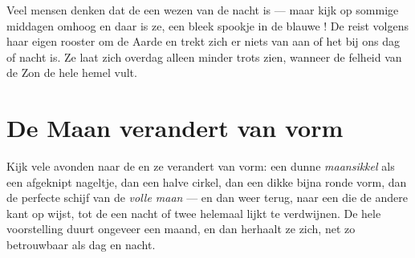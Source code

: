 \begin{remark}\label{rem:g2:moon-in-the-sky:daytime}
Veel mensen denken dat de  een wezen van de nacht is --- maar kijk
op sommige middagen omhoog en daar is ze, een bleek spookje in de
blauwe ! De  reist volgens haar eigen rooster om de Aarde en
trekt zich er niets van aan of het bij ons dag of nacht is. Ze laat
zich overdag alleen minder trots zien, wanneer de felheid van de Zon de
hele hemel vult.
\end{remark}

\section{De Maan verandert van vorm}

\begin{example}\label{ex:g2:moon-in-the-sky:shapes}
Kijk vele avonden naar de  en ze verandert van vorm: een dunne
\emph{maansikkel} als een afgeknipt nageltje, dan
een halve cirkel, dan een dikke bijna ronde vorm, dan de perfecte
schijf van de \emph{volle maan} --- en dan weer
terug, naar een  die de andere kant op wijst, tot de
 een nacht of twee helemaal lijkt te verdwijnen. De hele
voorstelling duurt ongeveer een maand, en dan herhaalt ze zich, net zo
betrouwbaar als dag en nacht.
\end{example}

